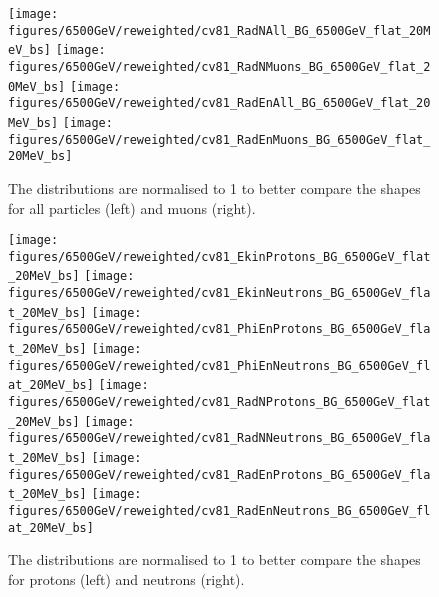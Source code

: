 \begin{figure}
\begin{center}
  \texttt{[image: figures/6500GeV/reweighted/cv81\_RadNAll\_BG\_6500GeV\_flat\_20MeV\_bs]}
  \texttt{[image: figures/6500GeV/reweighted/cv81\_RadNMuons\_BG\_6500GeV\_flat\_20MeV\_bs]}
  \texttt{[image: figures/6500GeV/reweighted/cv81\_RadEnAll\_BG\_6500GeV\_flat\_20MeV\_bs]}
  \texttt{[image: figures/6500GeV/reweighted/cv81\_RadEnMuons\_BG\_6500GeV\_flat\_20MeV\_bs]}
\end{center}
\vspace{-0.6cm}
 \caption{The distributions are normalised to 1 to better compare the shapes for all particles (left) and muons (right).
  \label{fig:EkinPhiEn6p52}}
\end{figure}



\begin{figure}
\begin{center}
  \texttt{[image: figures/6500GeV/reweighted/cv81\_EkinProtons\_BG\_6500GeV\_flat\_20MeV\_bs]}
  \texttt{[image: figures/6500GeV/reweighted/cv81\_EkinNeutrons\_BG\_6500GeV\_flat\_20MeV\_bs]}
  \texttt{[image: figures/6500GeV/reweighted/cv81\_PhiEnProtons\_BG\_6500GeV\_flat\_20MeV\_bs]}
  \texttt{[image: figures/6500GeV/reweighted/cv81\_PhiEnNeutrons\_BG\_6500GeV\_flat\_20MeV\_bs]}
  \texttt{[image: figures/6500GeV/reweighted/cv81\_RadNProtons\_BG\_6500GeV\_flat\_20MeV\_bs]}
  \texttt{[image: figures/6500GeV/reweighted/cv81\_RadNNeutrons\_BG\_6500GeV\_flat\_20MeV\_bs]}
  \texttt{[image: figures/6500GeV/reweighted/cv81\_RadEnProtons\_BG\_6500GeV\_flat\_20MeV\_bs]}
  \texttt{[image: figures/6500GeV/reweighted/cv81\_RadEnNeutrons\_BG\_6500GeV\_flat\_20MeV\_bs]}
\end{center}
\vspace{-0.6cm}
 \caption{The distributions are normalised to 1 to better compare the shapes for protons (left) and neutrons (right).
  \label{fig:ProtNeut6p52}} 
\end{figure}

